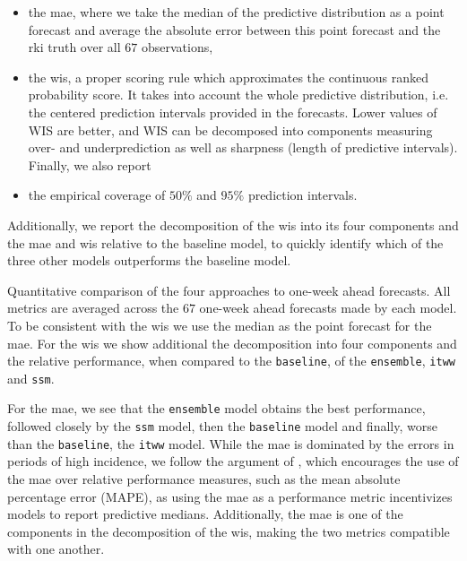 \begin{itemize}
    \item the \acrlong{mae}, where we take the median of the predictive distribution as a point forecast and average the absolute error between this point forecast and the \acrshort{rki} truth over all $67$ observations,
    \item the \acrlong{wis}\citep{Bracher2021Evaluating}, a proper scoring rule which approximates the continuous ranked probability score. It takes into account the whole predictive distribution, i.e. the centered prediction intervals provided in the forecasts. Lower values of WIS are better, and WIS can be decomposed into components measuring over- and underprediction as well as sharpness (length of predictive intervals). Finally, we also report
    \item the empirical coverage of $50\%$ and $95\%$ prediction intervals. 
\end{itemize}

Additionally, we report the decomposition of the \acrshort{wis} into its four components and the \acrshort{mae} and \acrshort{wis} relative to the baseline model, to quickly identify which of the three other models outperforms the baseline model. 

\begin{table}
    \centering
    
    \caption{Quantitative comparison of the four approaches to one-week ahead forecasts. All metrics are averaged across the $67$ one-week ahead forecasts made by each model. To be consistent with the \gls{wis} we use the median as the point forecast for the \gls{mae}. For the \gls{wis} we show additional the decomposition into four components and the relative performance, when compared to the \texttt{baseline}, of the \texttt{ensemble}, \texttt{itww} and \texttt{ssm}. }
    \label{tab:regional_forecasts_combined_metrics}
\end{table}

For the \acrshort{mae}, we see that the \texttt{ensemble} model obtains the best performance, followed closely by the \texttt{ssm} model, then the \texttt{baseline} model and finally, worse than the \texttt{baseline}, the \texttt{itww} model. While the \acrshort{mae} is dominated by the errors in periods of high incidence, we follow the argument of \citep[Section 5]{Bracher2021Evaluating}, which encourages the use of the \acrshort{mae} over relative performance measures, such as the mean absolute percentage error (MAPE), as using the \acrshort{mae} as a performance metric incentivizes models to report predictive medians. 
Additionally, the \acrshort{mae} is one of the components in the decomposition of the \acrshort{wis}, making the two metrics compatible with one another. 

